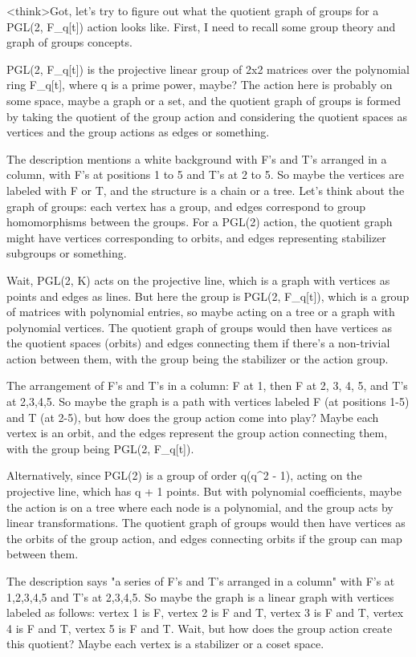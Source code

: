<think>Got, let's try to figure out what the quotient graph of groups for a PGL(2, F_q[t]) action looks like. First, I need to recall some group theory and graph of groups concepts. 

PGL(2, F_q[t]) is the projective linear group of 2x2 matrices over the polynomial ring F_q[t], where q is a prime power, maybe? The action here is probably on some space, maybe a graph or a set, and the quotient graph of groups is formed by taking the quotient of the group action and considering the quotient spaces as vertices and the group actions as edges or something. 

The description mentions a white background with F's and T's arranged in a column, with F's at positions 1 to 5 and T's at 2 to 5. So maybe the vertices are labeled with F or T, and the structure is a chain or a tree. Let's think about the graph of groups: each vertex has a group, and edges correspond to group homomorphisms between the groups. For a PGL(2) action, the quotient graph might have vertices corresponding to orbits, and edges representing stabilizer subgroups or something. 

Wait, PGL(2, K) acts on the projective line, which is a graph with vertices as points and edges as lines. But here the group is PGL(2, F_q[t]), which is a group of matrices with polynomial entries, so maybe acting on a tree or a graph with polynomial vertices. The quotient graph of groups would then have vertices as the quotient spaces (orbits) and edges connecting them if there's a non-trivial action between them, with the group being the stabilizer or the action group. 

The arrangement of F's and T's in a column: F at 1, then F at 2, 3, 4, 5, and T's at 2,3,4,5. So maybe the graph is a path with vertices labeled F (at positions 1-5) and T (at 2-5), but how does the group action come into play? Maybe each vertex is an orbit, and the edges represent the group action connecting them, with the group being PGL(2, F_q[t]). 

Alternatively, since PGL(2) is a group of order q(q^2 - 1), acting on the projective line, which has q + 1 points. But with polynomial coefficients, maybe the action is on a tree where each node is a polynomial, and the group acts by linear transformations. The quotient graph of groups would then have vertices as the orbits of the group action, and edges connecting orbits if the group can map between them. 

The description says "a series of F's and T's arranged in a column" with F's at 1,2,3,4,5 and T's at 2,3,4,5. So maybe the graph is a linear graph with vertices labeled as follows: vertex 1 is F, vertex 2 is F and T, vertex 3 is F and T, vertex 4 is F and T, vertex 5 is F and T. Wait, but how does the group action create this quotient? Maybe each vertex is a stabilizer or a coset space. 

